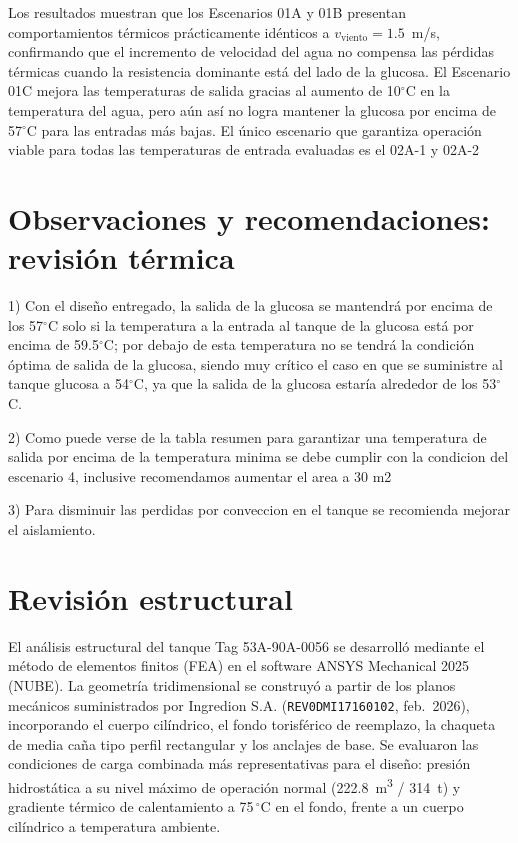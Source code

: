 \documentclass[12pt,a4paper]{elsarticle}
\begin{document}
Los resultados muestran que los Escenarios 01A y 01B presentan comportamientos t\'{e}rmicos pr\'{a}cticamente id\'{e}nticos a $v_{\text{viento}}=1.5$~m/s, confirmando que el incremento de velocidad del agua no compensa las p\'{e}rdidas t\'{e}rmicas cuando la resistencia dominante est\'{a} del lado de la glucosa. El Escenario 01C mejora las temperaturas de salida gracias al aumento de 10$^\circ$C en la temperatura del agua, pero a\'{u}n as\'{i} no logra mantener la glucosa por encima de 57$^\circ$C para las entradas m\'{a}s bajas. El \'{u}nico escenario que garantiza operaci\'{o}n viable  para todas las temperaturas de entrada evaluadas es el 02A-1 y 02A-2


\section{Observaciones y recomendaciones: revisi\'{o}n t\'{e}rmica}


1) Con el diseño entregado, la salida de la glucosa se mantendrá por encima de los 57$^\circ$C solo si la temperatura a la entrada al tanque de la glucosa está por encima de 59.5$^\circ$C; por debajo de esta temperatura no se tendrá la condición óptima de salida de la glucosa, siendo muy crítico el caso en que se suministre al tanque glucosa a 54$^\circ$C, ya que la salida de la glucosa estaría alrededor de los 53$^\circ$C.

2) Como puede verse de la tabla resumen para garantizar una temperatura de salida por encima de la temperatura minima se debe cumplir con la condicion del escenario 4, inclusive recomendamos aumentar el area a 30 m2

3) Para disminuir las perdidas por conveccion en el tanque se recomienda mejorar el aislamiento.



\section{Revisi\'{o}n estructural}

El an\'{a}lisis estructural del tanque Tag 53A-90A-0056 se desarroll\'{o} mediante el m\'{e}todo de elementos finitos (FEA) en el software ANSYS Mechanical 2025 (NUBE). La geometr\'{i}a tridimensional se construy\'{o} a partir de los planos mec\'{a}nicos suministrados por Ingredion S.A. (\texttt{REV0DMI17160102}, feb.~2026), incorporando el cuerpo cil\'{i}ndrico, el fondo torisf\'{e}rico de reemplazo, la chaqueta de media ca\~{n}a tipo perfil rectangular y los anclajes de base. Se evaluaron las condiciones de carga combinada m\'{a}s representativas para el dise\~{n}o: presi\'{o}n hidrost\'{a}tica a su nivel m\'{a}ximo de operaci\'{o}n normal (222.8~m\textsuperscript{3} / 314~t) y gradiente t\'{e}rmico de calentamiento a 75\,$^\circ$C en el fondo, frente a un cuerpo cil\'{i}ndrico a temperatura ambiente.
\end{document}
